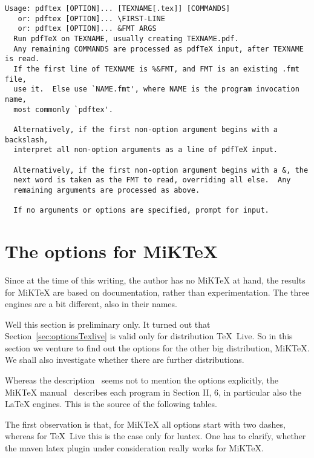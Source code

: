 \documentclass[a4paper, english]{article}%
\newcommand{\texlive}{\TeX~Live}
\newcommand{\miktex}{MiKTeX}
\begin{document}
\begin{verbatim}
Usage: pdftex [OPTION]... [TEXNAME[.tex]] [COMMANDS]
   or: pdftex [OPTION]... \FIRST-LINE
   or: pdftex [OPTION]... &FMT ARGS
  Run pdfTeX on TEXNAME, usually creating TEXNAME.pdf.
  Any remaining COMMANDS are processed as pdfTeX input, after TEXNAME is read.
  If the first line of TEXNAME is %&FMT, and FMT is an existing .fmt file,
  use it.  Else use `NAME.fmt', where NAME is the program invocation name,
  most commonly `pdftex'.

  Alternatively, if the first non-option argument begins with a backslash,
  interpret all non-option arguments as a line of pdfTeX input.

  Alternatively, if the first non-option argument begins with a &, the
  next word is taken as the FMT to read, overriding all else.  Any
  remaining arguments are processed as above.

  If no arguments or options are specified, prompt for input.
\end{verbatim}





\section{The options for \miktex}\label{sec:optionsMiktex}

Since at the time of this writing, the author has no \miktex{} at hand, 
the results for \miktex{} are based on documentation, rather than experimentation. 
The three engines are a bit different, also in their names. 


Well this section is preliminary only. 
It turned out that Section~\ref{sec:optionsTexlive} is valid only for distribution \texlive. 
So in this section we venture to find out the options for the other big distribution, 
\miktex. 
We shall also investigate whether there are further distributions. 

Whereas the description~\cite{Texlive} seems not to mention the options explicitly, 
the \miktex{} manual~\cite{MiKTeX} describes each program in Section II, 6, 
in particular also the \LaTeX{} engines. 
This is the source of the following tables. 


The first observation is that, for \miktex{} all options start with two dashes, 
whereas for \texlive{} this is the case only for luatex. 
One has to clarify, 
whether the maven latex plugin under consideration really works for \miktex. 
\end{document}

